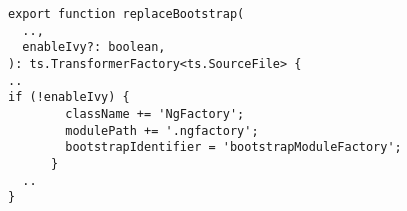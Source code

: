 \begin{verbatim}
export function replaceBootstrap(
  ..,
  enableIvy?: boolean,
): ts.TransformerFactory<ts.SourceFile> {
..
if (!enableIvy) {
        className += 'NgFactory';
        modulePath += '.ngfactory';
        bootstrapIdentifier = 'bootstrapModuleFactory';
      }
  ..
}
\end{verbatim}
